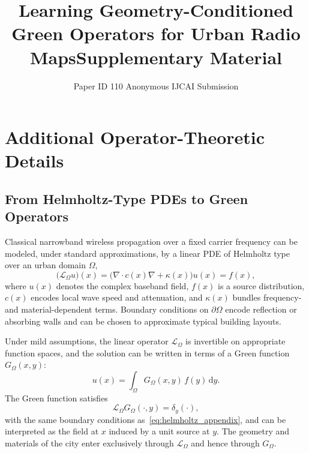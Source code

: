 \documentclass{article}
\title{Learning Geometry-Conditioned Green Operators for Urban Radio Maps}
\author{
    Paper ID 110
    \affiliations
    Anonymous IJCAI Submission
}
\begin{document}
\title{Supplementary Material}
\maketitle

\appendix


\section{Additional Operator-Theoretic Details}
\label{app:operator_details}

\subsection{From Helmholtz-Type PDEs to Green Operators}

Classical narrowband wireless propagation over a fixed carrier frequency
can be modeled, under standard approximations, by a linear PDE of
Helmholtz type over an urban domain $\Omega$,
\begin{equation}
\big(\mathcal{L}_\Omega u\big)(x)
= \big(\nabla \cdot c(x)\nabla + \kappa(x)\big) u(x)
= f(x),
\label{eq:helmholtz_appendix}
\end{equation}
where $u(x)$ denotes the complex baseband field,
$f(x)$ is a source distribution,
$c(x)$ encodes local wave speed and attenuation,
and $\kappa(x)$ bundles frequency- and material-dependent terms.
Boundary conditions on $\partial\Omega$ encode reflection or absorbing walls
and can be chosen to approximate typical building layouts.

Under mild assumptions, the linear operator $\mathcal{L}_\Omega$ is
invertible on appropriate function spaces, and the solution can be written
in terms of a Green function $G_\Omega(x, y)$:
\begin{equation}
u(x)
= \int_\Omega G_\Omega(x, y)\, f(y)\,\mathrm{d}y.
\end{equation}
The Green function satisfies
\begin{equation}
\mathcal{L}_\Omega G_\Omega(\cdot, y)
= \delta_y(\cdot),
\end{equation}
with the same boundary conditions as~\eqref{eq:helmholtz_appendix},
and can be interpreted as the field at $x$ induced by a unit source at $y$.
The geometry and materials of the city enter exclusively through
$\mathcal{L}_\Omega$ and hence through $G_\Omega$.
\end{document}
